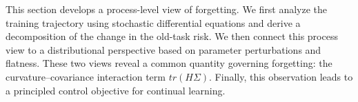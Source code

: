 \documentclass{article}
\begin{document}
This section develops a process-level view of forgetting.
We first analyze the training trajectory using stochastic differential equations and derive a decomposition of the change in the old-task risk.
We then connect this process view to a distributional perspective based on parameter perturbations and flatness.
These two views reveal a common quantity governing forgetting: the curvature–covariance interaction term
$tr(H\Sigma)$.
Finally, this observation leads to a principled control objective for continual learning.













\end{document}
